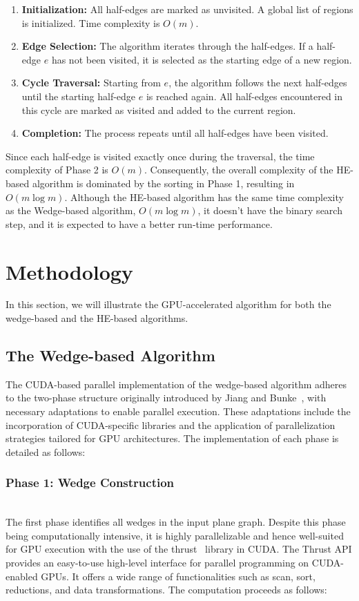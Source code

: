 \documentclass[conference]{IEEEtran}
\begin{document}
\begin{enumerate}
    \item \textbf{Initialization:} All half-edges are marked as unvisited. A global list of regions is initialized. Time complexity is $O(m)$.
    \item \textbf{Edge Selection:} The algorithm iterates through the half-edges. If a half-edge $e$ has not been visited, it is selected as the starting edge of a new region.
    \item \textbf{Cycle Traversal:} Starting from $e$, the algorithm follows the next half-edges until the starting half-edge $e$ is reached again. All half-edges encountered in this cycle are marked as visited and added to the current region.
    \item \textbf{Completion:} The process repeats until all half-edges have been visited. 
\end{enumerate}

Since each half-edge is visited exactly once during the traversal, the time complexity of Phase 2 is $O(m)$. Consequently, the overall complexity of the HE-based algorithm is dominated by the sorting in Phase 1, resulting in $O(m \log m)$. Although the HE-based algorithm has the same time complexity as the Wedge-based algorithm, $O(m \log m)$, it doesn't have the binary search step, and it is expected to have a better run-time performance.


\section{Methodology}
In this section, we will illustrate the GPU-accelerated algorithm for both the wedge-based and the HE-based algorithms.  

\subsection{The Wedge-based Algorithm}
The CUDA-based parallel implementation of the wedge-based algorithm adheres to the two-phase structure originally introduced by Jiang and Bunke~\cite{JIANG1993553}, with necessary adaptations to enable parallel execution. These adaptations include the incorporation of CUDA-specific libraries and the application of parallelization strategies tailored for GPU architectures. The implementation of each phase is detailed as follows:

\subsubsection{Phase 1: Wedge Construction}\hfill\\
The first phase identifies all wedges in the input plane graph. Despite this phase being computationally intensive, it is highly parallelizable and hence well-suited for GPU execution with the use of the thrust~\cite{BELL2012359} library in CUDA. The Thrust API provides an easy-to-use high-level interface for parallel programming on CUDA-enabled GPUs. It offers a wide range of functionalities such as scan, sort, reductions, and data transformations. 
The computation proceeds as follows:
\end{document}
